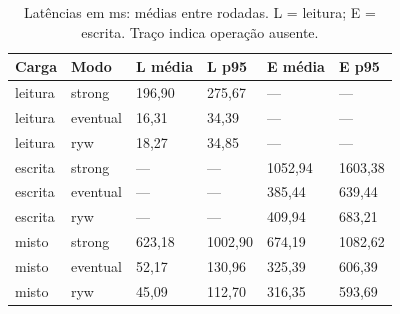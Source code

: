 \begingroup\small\setlength{\tabcolsep}{4pt}
\begin{table}[htbp]\centering
\caption{Latências em ms: médias entre rodadas. L = leitura; E = escrita. Traço indica operação ausente.}
\begin{tabular}{llllll}
\toprule
Carga & Modo & L média & L p95 & E média & E p95\\\midrule
leitura & strong & 196,90 & 275,67 & --- & ---\\
leitura & eventual & 16,31 & 34,39 & --- & ---\\
leitura & ryw & 18,27 & 34,85 & --- & ---\\
escrita & strong & --- & --- & 1052,94 & 1603,38\\
escrita & eventual & --- & --- & 385,44 & 639,44\\
escrita & ryw & --- & --- & 409,94 & 683,21\\
misto & strong & 623,18 & 1002,90 & 674,19 & 1082,62\\
misto & eventual & 52,17 & 130,96 & 325,39 & 606,39\\
misto & ryw & 45,09 & 112,70 & 316,35 & 593,69\\
\bottomrule\end{tabular}\end{table}
\endgroup

\clearpage